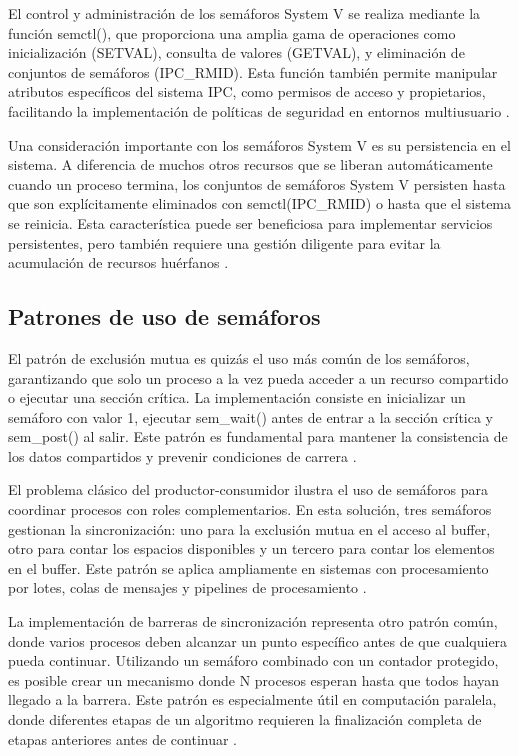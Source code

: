 {El control y administración de los semáforos System V se realiza mediante la función semctl(), que proporciona una amplia gama de operaciones como inicialización (SETVAL), consulta de valores (GETVAL), y eliminación de conjuntos de semáforos (IPC\_RMID). Esta función también permite manipular atributos específicos del sistema IPC, como permisos de acceso y propietarios, facilitando la implementación de políticas de seguridad en entornos multiusuario \cite{love2013linux}.
\vspace{10pt}

Una consideración importante con los semáforos System V es su persistencia en el sistema. A diferencia de muchos otros recursos que se liberan automáticamente cuando un proceso termina, los conjuntos de semáforos System V persisten hasta que son explícitamente eliminados con semctl(IPC\_RMID) o hasta que el sistema se reinicia. Esta característica puede ser beneficiosa para implementar servicios persistentes, pero también requiere una gestión diligente para evitar la acumulación de recursos huérfanos \cite{tanenbaum2015modern}.

\subsection{Patrones de uso de semáforos}

El patrón de exclusión mutua es quizás el uso más común de los semáforos, garantizando que solo un proceso a la vez pueda acceder a un recurso compartido o ejecutar una sección crítica. La implementación consiste en inicializar un semáforo con valor 1, ejecutar sem\_wait() antes de entrar a la sección crítica y sem\_post() al salir. Este patrón es fundamental para mantener la consistencia de los datos compartidos y prevenir condiciones de carrera \cite{herlihy2012art}.
\vspace{10pt}

El problema clásico del productor-consumidor ilustra el uso de semáforos para coordinar procesos con roles complementarios. En esta solución, tres semáforos gestionan la sincronización: uno para la exclusión mutua en el acceso al buffer, otro para contar los espacios disponibles y un tercero para contar los elementos en el buffer. Este patrón se aplica ampliamente en sistemas con procesamiento por lotes, colas de mensajes y pipelines de procesamiento \cite{silberschatz2018operating}.
\vspace{10pt}

La implementación de barreras de sincronización representa otro patrón común, donde varios procesos deben alcanzar un punto específico antes de que cualquiera pueda continuar. Utilizando un semáforo combinado con un contador protegido, es posible crear un mecanismo donde N procesos esperan hasta que todos hayan llegado a la barrera. Este patrón es especialmente útil en computación paralela, donde diferentes etapas de un algoritmo requieren la finalización completa de etapas anteriores antes de continuar \cite{pacheco2011introduction}.
\vspace{10pt}

}
